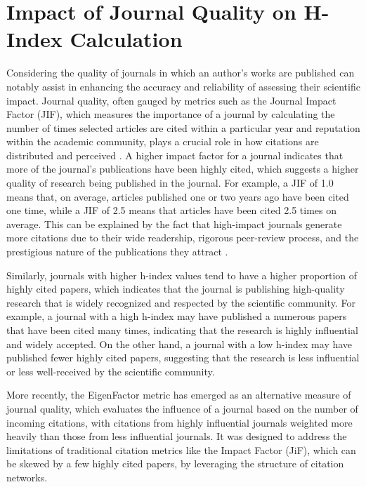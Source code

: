 \section{Impact of Journal Quality on H-Index Calculation}
Considering the quality of journals in which an author's works are published
can notably assist in enhancing the accuracy and reliability of assessing their
scientific impact. Journal quality, often gauged by metrics such as the Journal
Impact Factor (JIF), which measures the importance of a journal by calculating
the number of times selected articles are cited within a particular year and
reputation within the academic community, plays a crucial role in how citations
are distributed and perceived \cite{garfield1999journal, garfield2006history}.
A higher impact factor for a journal indicates that more of the journal's
publications have been highly cited, which suggests a higher quality of
research being published in the journal. For example, a JIF of 1.0 means that,
on average, articles published one or two years ago have been cited one time,
while a JIF of 2.5 means that articles have been cited 2.5 times on average.
This can be explained by the fact that high-impact journals generate more
citations due to their wide readership, rigorous peer-review process, and the
prestigious nature of the publications they attract \cite{garfield2006history}.

Similarly, journals with higher h-index values tend to have a higher proportion
of highly cited papers, which indicates that the journal is publishing
high-quality research that is widely recognized and respected by the scientific
community. For example, a journal with a high h-index may have published a
numerous papers that have been cited many times, indicating that
the research is highly influential and widely accepted. On the other hand, a
journal with a low h-index may have published fewer highly cited papers,
suggesting that the research is less influential or less well-received by the
scientific community.

More recently, the EigenFactor metric has emerged as an alternative measure of
journal quality, which evaluates the influence of a journal based on the number
of incoming citations, with citations from highly influential journals weighted
more heavily than those from less influential journals. It was designed to
address the limitations of traditional citation metrics like the Impact Factor
(JiF), which can be skewed by a few highly cited papers, by leveraging the
structure of citation networks.

